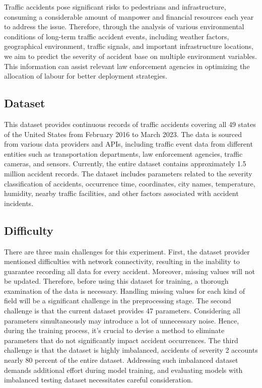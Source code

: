 \documentclass[10pt,twocolumn,letterpaper]{article}
\begin{document}
\begin{CJK}{UTF8}{bsmi}
Traffic accidents pose significant risks to pedestrians and infrastructure, consuming a considerable amount of manpower and financial resources each year to address the issue. Therefore, through the analysis of various environmental conditions of long-term traffic accident events, including weather factors, geographical environment, traffic signals, and important infrastructure locations, we aim to predict the severity of accident base on multiple environment variables. This information can assist relevant law enforcement agencies in optimizing the allocation of labour for better deployment strategies.

\subsection{Dataset}
This dataset provides continuous records of traffic accidents covering all 49 states of the United States from February 2016 to March 2023. The data is sourced from various data providers and APIs, including traffic event data from different entities such as transportation departments, law enforcement agencies, traffic cameras, and sensors. Currently, the entire dataset contains approximately 1.5 million accident records.
The dataset includes parameters related to the severity classification of accidents, occurrence time, coordinates, city names, temperature, humidity, nearby traffic facilities, and other factors associated with accident incidents.

\subsection{Difficulty}
There are three main challenges for this experiment. First, the dataset provider mentioned difficulties with network connectivity, resulting in the inability to guarantee recording all data for every accident. Moreover, missing values will not be updated. Therefore, before using this dataset for training, a thorough examination of the data is necessary. Handling missing values for each kind of field will be a significant challenge in the preprocessing stage.
The second challenge is that the current dataset provides 47 parameters. Considering all parameters simultaneously may introduce a lot of unnecessary noise. Hence, during the training process, it's crucial to devise a method to eliminate parameters that do not significantly impact accident occurrences. The third challenge is that the dataset is highly imbalanced, accidents of severity 2 accounts nearly 80 percent of the entire dataset. Addressing such imbalanced dataset demands additional effort during model training, and evaluating models with imbalanced testing dataset necessitates careful consideration.



\end{CJK}
\end{document}
